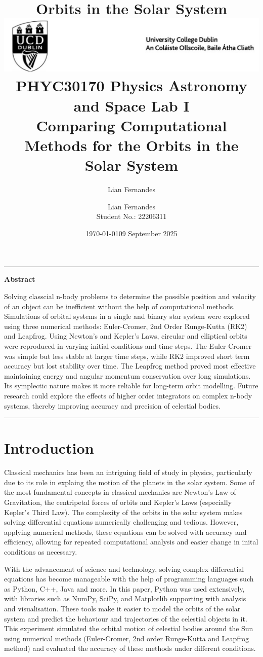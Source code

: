 \documentclass[11 pt, a4paper, twocolumn]{article}
\title{\bfseries Orbits in the Solar System}
\author{Lian Fernandes}
\date{\today}
\title{%
\includegraphics[width=0.9\linewidth]{UCD_Logo.png}\\ %
{\large PHYC30170 Physics Astronomy and Space Lab I}\\ %
{\bfseries Comparing Computational Methods for the Orbits in the Solar System} %
}
\author{Lian Fernandes \\ \small Student No.: 22206311}
\date{09 September 2025}
\renewenvironment{abstract}{%
  \par\noindent\rule{\linewidth}{0.4pt}\par
  \begin{center}\bfseries Abstract\end{center}%
}{%
  \par\rule{\linewidth}{0.4pt}\par
}
\begin{document}
\onecolumn
\maketitle


\begin{abstract}
Solving classcial n-body problems to determine the possible position and velocity of an object can be inefficient 
without the help of computational methods. Simulations of orbital systems in a single and binary star system were explored
using three numerical methods: Euler-Cromer, 2nd Order Runge-Kutta (RK2) and Leapfrog. Using Newton's and Kepler's Laws, circular
and elliptical orbits were reproduced in varying initial conditions and time steps. The Euler-Cromer was simple but less stable 
at larger time steps, while RK2 improved short term accuracy but lost stability over time. The Leapfrog method proved most effective
maintaining energy and angular momentum conservation over long simulations. Its symplectic nature makes it more reliable for
long-term orbit modelling. Future research could explore the effects of higher order integrators on complex n-body systems, thereby
improving accuracy and precision of celestial bodies.
\end{abstract}

\twocolumn

\section{Introduction}
Classical mechanics has been an intriguing field of study in physics, particularly due to its role in 
explaing the motion of the planets in the solar system. Some of the most fundamental concepts in 
classical mechanics are Newton's Law of Gravitation, the centripetal forces of orbits and Kepler's Laws 
(especially Kepler's Third Law). The complexity of the orbits in the solar system makes solving 
differential equations numerically challenging and tedious. However, applying numerical methods,
these equations can be solved with accuracy and efficiency, allowing for repeated computational analysis
and easier change in inital conditions as necessary.

With the advancement of science and technology, solving complex differential equations has become
manageable with the help of programming languages such as Python, C++, Java and more. In this paper, 
Python was used extensively, with libraries such as NumPy, SciPy, and Matplotlib supporting with 
analysis and visualisation. These tools make it easier to model the orbits of the solar system and
predict the behaviour and trajectories of the celestial objects in it. This experiment simulated the 
orbital motion of celestial bodies around the Sun using numerical methods (Euler-Cromer, 2nd order 
Runge-Kutta and Leapfrog method) and evaluated the accuracy of these methods under different conditions.
\end{document}
